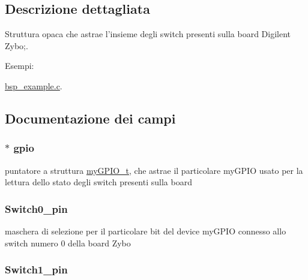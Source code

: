 \subsection{Descrizione dettagliata}
Struttura opaca che astrae l'insieme degli switch presenti sulla board Digilent Zybo;. \begin{Desc}
\item[Esempi\+: ]\par
\hyperlink{bsp_example_8c-example}{bsp\+\_\+example.\+c}.\end{Desc}


\subsection{Documentazione dei campi}
\hypertarget{struct_zybo_switch__t_ac37ddc7c58d246d233dfb38037020184}{
\subsubsection[{gpio}]{$\ast$ gpio}}\label{struct_zybo_switch__t_ac37ddc7c58d246d233dfb38037020184}
puntatore a struttura \hyperlink{structmy_g_p_i_o__t}{my\+G\+P\+I\+O\+\_\+t}, che astrae il particolare my\+G\+P\+I\+O usato per la lettura dello stato degli switch presenti sulla board \hypertarget{struct_zybo_switch__t_aa125c82837d72bdb20a0e22f3a86646e}{
\subsubsection[{Switch0\+\_\+pin}]{ Switch0\+\_\+pin}}\label{struct_zybo_switch__t_aa125c82837d72bdb20a0e22f3a86646e}
maschera di selezione per il particolare bit del device my\+G\+P\+I\+O connesso allo switch numero 0 della board Zybo \hypertarget{struct_zybo_switch__t_aa031241ea0c12a6f327d3697113e992c}{
\subsubsection[{Switch1\+\_\+pin}]{ Switch1\+\_\+pin}}\label{struct_zybo_switch__t_aa031241ea0c12a6f327d3697113e992c}

